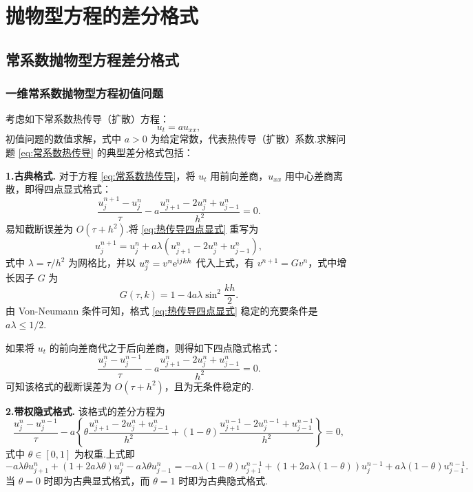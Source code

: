 \chapter{抛物型方程的差分格式}

\section{常系数抛物型方程差分格式}

\subsection{一维常系数抛物型方程初值问题}

考虑如下常系数热传导（扩散）方程：
\begin{equation}\label{eq:常系数热传导}
    u_t = au_{xx},
\end{equation}
初值问题的数值求解，式中 $a > 0$ 为给定常数，代表热传导（扩散）系数.求解问题 \eqref{eq:常系数热传导} 的典型差分格式包括：

\noindent\textbf{1.古典格式.} 对于方程 \eqref{eq:常系数热传导}，将 $u_t$ 用前向差商，$u_{xx}$ 用中心差商离散，即得四点显式格式：
    \begin{equation}\label{eq:热传导四点显式}
        \frac{u_j^{n+1} - u_j^n}{\tau} - a \frac{u_{j+1}^n - 2u_j^n + u_{j-1}^n}{h^2} = 0.
    \end{equation}
    易知截断误差为 $O(\tau + h^2)$.将 \eqref{eq:热传导四点显式} 重写为
    \begin{equation*}
        u_j^{n+1} = u_j^n + a\lambda(u_{j+1}^n - 2u_j^n + u_{j-1}^n),
    \end{equation*}
    式中 $\lambda = \tau/h^2$ 为网格比，并以 $u_j^n = v^n\mathrm{e}^{\mathrm{i} jkh}$ 代入上式，有 $v^{n+1} = Gv^n$，式中增长因子 $G$ 为
    \begin{equation*}
        G(\tau, k) = 1 - 4a\lambda \sin^2 \frac{kh}{2}.
    \end{equation*}
    由 Von-Neumann 条件可知，格式 \eqref{eq:热传导四点显式} 稳定的充要条件是 $a\lambda \leq 1/2$.

    如果将 $u_t$ 的前向差商代之于后向差商，则得如下四点隐式格式：
    \begin{equation*}
        \frac{u_j^n - u_j^{n-1}}{\tau} - a \frac{u_{j+1}^n - 2u_j^n + u_{j-1}^n}{h^2} = 0.
    \end{equation*}
    可知该格式的截断误差为 $O(\tau + h^2)$，且为无条件稳定的.

\noindent\textbf{2.带权隐式格式.} 该格式的差分方程为
    \begin{equation}\label{eq:4.3}
        \frac{u_j^n - u_j^{n-1}}{\tau} - a \left\{ \theta \frac{u_{j+1}^n - 2u_j^n + u_{j-1}^n}{h^2} + (1 - \theta) \frac{u_{j+1}^{n-1} - 2u_j^{n-1} + u_{j-1}^{n-1}}{h^2} \right\} = 0,
    \end{equation}
    式中 $\theta \in [0, 1]$ 为权重.上式即
    \begin{equation*}
        -a\lambda\theta u_{j+1}^n + (1 + 2a\lambda\theta) u_j^n - a\lambda\theta u_{j-1}^n = -a\lambda(1-\theta) u_{j+1}^{n-1} + (1 + 2a\lambda(1-\theta)) u_j^{n-1} + a\lambda(1-\theta) u_{j-1}^{n-1}.
    \end{equation*}
    当 $\theta = 0$ 时即为古典显式格式，而 $\theta = 1$ 时即为古典隐式格式.
    
